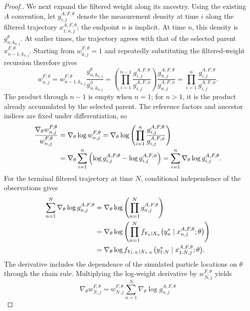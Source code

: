 \documentclass[11pt]{article}
\theoremstyle{thmstylethree}%
\begin{document}
\begin{proof}[Proof.]
We next expand the filtered weight along its ancestry. Using the existing
$A$ convention, let $g_{i,j}^{A,F,\theta}$ denote the measurement density
at time $i$ along the filtered trajectory $x_{1:n,j}^{A,F,\theta}$;
the endpoint $n$ is implicit. At time $n$, this density is
$g_{n,k_{n,j}}^\theta$. At earlier times, the trajectory agrees with that
of the selected parent $x_{n-1,k_{n,j}}^{F,\theta}$.
Starting from $w_{0,j}^{F,\theta}=1$ and repeatedly substituting the
filtered-weight recursion therefore gives
\begin{equation}
w_{n,j}^{F,\theta}
=w_{n-1,k_{n,j}}^{F,\theta}
 \frac{g_{n,k_{n,j}}^\theta}{g_{n,k_{n,j}}^\phi}
=\left(\prod_{i=1}^{n-1}
 \frac{g_{i,j}^{A,F,\theta}}{g_{i,j}^{A,F,\phi}}\right)
 \frac{g_{n,j}^{A,F,\theta}}{g_{n,j}^{A,F,\phi}}
=\prod_{i=1}^{n}\frac{g_{i,j}^{A,F,\theta}}{g_{i,j}^{A,F,\phi}}.
\label{eq:lemma-s1-ratio}
\end{equation}
The product through $n-1$ is empty when $n=1$; for $n>1$, it is the
product already accumulated by the selected parent. The reference
factors and ancestor indices are fixed under differentiation, so
\begin{align}
\frac{\nabla_\theta w_{n,j}^{F,\theta}}{w_{n,j}^{F,\theta}}
&=\nabla_\theta\log w_{n,j}^{F,\theta}
 =\nabla_\theta\log\left(
 \prod_{i=1}^{n}\frac{g_{i,j}^{A,F,\theta}}{g_{i,j}^{A,F,\phi}}\right)
 \notag\\*
&=\nabla_\theta\sum_{i=1}^{n}
 \left(\log g_{i,j}^{A,F,\theta}-\log g_{i,j}^{A,F,\phi}\right)
 =\sum_{i=1}^{n}\nabla_\theta\log g_{i,j}^{A,F,\theta}.
\end{align}
For the terminal filtered trajectory at time $N$, conditional independence
of the observations gives
\begin{align}
\sum_{n=1}^{N}\nabla_\theta\log g_{n,j}^{A,F,\theta}
&=\nabla_\theta\log\left(\prod_{n=1}^{N}g_{n,j}^{A,F,\theta}\right)
 \notag\\*
&=\nabla_\theta\log\left(\prod_{n=1}^{N}f_{Y_n|X_n}
 \big(y_n^*\mid x_{n,j}^{A,F,\theta};\theta\big)\right)
 \notag\\*
&=\nabla_\theta\log f_{Y_{1:N}|X_{1:N}}
 \big(y_{1:N}^*\mid x_{1:N,j}^{A,F,\theta};\theta\big).
\end{align}
The derivative includes the dependence of the simulated particle locations
on $\theta$ through the chain rule. Multiplying the log-weight derivative
by $w_{N,j}^{F,\theta}$ yields
\begin{equation}
\nabla_\theta w_{N,j}^{F,\theta}
=w_{N,j}^{F,\theta}\sum_{n=1}^{N}\nabla_\theta\log g_{n,j}^{A,F,\theta}

\end{equation}
\end{proof}
\end{document}
